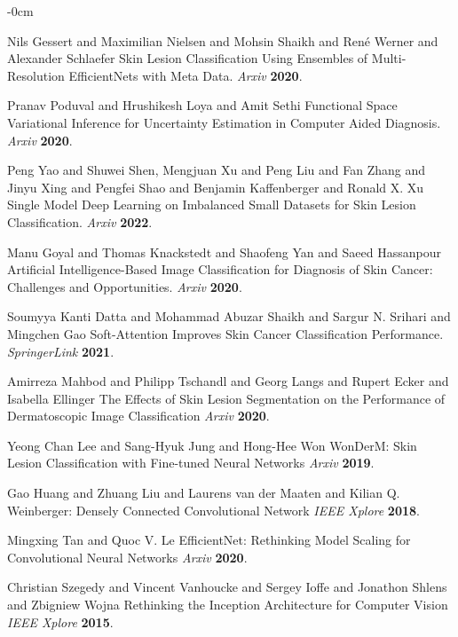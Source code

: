 \documentclass[sensors,article,submit,pdftex,moreauthors]{Definitions/mdpi}
\begin{document}
\begin{adjustwidth}{-\extralength}{0cm}
\begin{thebibliography}{999}
			Nils Gessert and Maximilian Nielsen and Mohsin Shaikh and René Werner and Alexander Schlaefer Skin Lesion Classification Using Ensembles of Multi-Resolution EfficientNets with Meta Data. 
			{\em Arxiv} 
			{\bf 2020}.
			
			Pranav Poduval and Hrushikesh Loya and Amit Sethi Functional Space Variational Inference for Uncertainty Estimation in Computer Aided Diagnosis. 
			{\em Arxiv} 
			{\bf 2020}.
			
			Peng Yao and Shuwei Shen, Mengjuan Xu and Peng Liu and Fan Zhang and Jinyu Xing and Pengfei Shao and Benjamin Kaffenberger and Ronald X. Xu Single Model Deep Learning on Imbalanced Small Datasets for Skin Lesion Classification. 
			{\em Arxiv} 
			{\bf 2022}.
			
			Manu Goyal and Thomas Knackstedt and Shaofeng Yan and Saeed Hassanpour Artificial Intelligence-Based Image Classification for Diagnosis of Skin Cancer: Challenges and Opportunities. 
			{\em Arxiv} 
			{\bf 2020}.
			
			Soumyya Kanti Datta and  Mohammad Abuzar Shaikh and Sargur N. Srihari and Mingchen Gao Soft-Attention Improves Skin Cancer Classification Performance. {\em SpringerLink} 
			{\bf 2021}.
			
			Amirreza Mahbod and Philipp Tschandl and Georg Langs and Rupert Ecker and Isabella Ellinger The Effects of Skin Lesion Segmentation on the Performance of Dermatoscopic Image Classification
			{\em Arxiv} 
			{\bf 2020}.
			
			Yeong Chan Lee and Sang-Hyuk Jung and Hong-Hee Won WonDerM: Skin Lesion Classification with Fine-tuned Neural Networks
			{\em Arxiv} 
			{\bf 2019}.
			
			Gao Huang and Zhuang Liu and Laurens van der Maaten and Kilian Q. Weinberger: Densely Connected Convolutional Network
			{\em IEEE Xplore} 
			{\bf 2018}.
			
			Mingxing Tan and Quoc V. Le EfficientNet: Rethinking Model Scaling for Convolutional Neural Networks
			{\em Arxiv} 
			{\bf 2020}.
			
			Christian Szegedy and Vincent Vanhoucke and Sergey Ioffe and Jonathon Shlens and Zbigniew Wojna Rethinking the Inception Architecture for Computer Vision
			{\em IEEE Xplore} 
			{\bf 2015}.
			

\end{thebibliography}
\end{adjustwidth}
\end{document}
